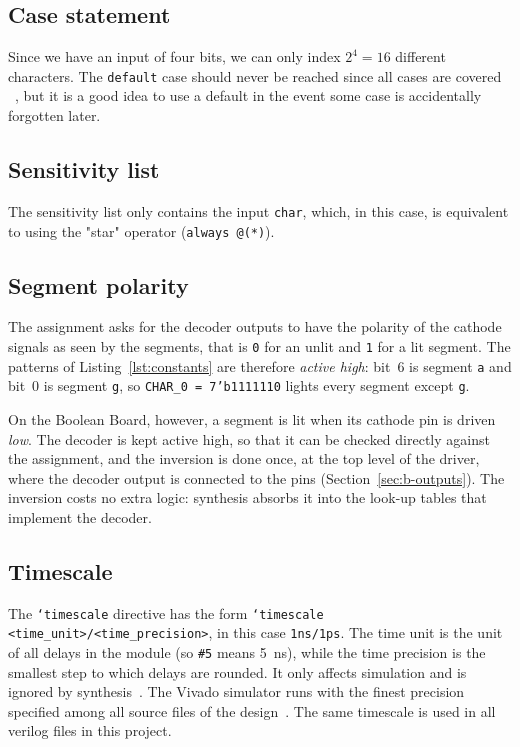 \documentclass{article}
\begin{document}


\subsection{Case statement}
Since we have an input of four bits, we can only index $2^4 = 16$ different characters.
The \texttt{default} case should never be reached since all cases are covered
~\cite[Case Statements]{ug901}, but it is a good idea to use a default in the event
some case is accidentally forgotten later.

\subsection{Sensitivity list}
The sensitivity list only contains the input \texttt{char}, which, in this case, is equivalent
to using the "star" operator (\texttt{always @(*)}).

\subsection{Segment polarity}
The assignment asks for the decoder outputs to have the polarity of the cathode
signals as seen by the segments, that is \texttt{0} for an unlit and \texttt{1}
for a lit segment. The patterns of Listing~\ref{lst:constants} are therefore
\emph{active high}: bit~6 is segment \texttt{a} and bit~0 is segment \texttt{g},
so \texttt{CHAR\_0 = 7'b1111110} lights every segment except \texttt{g}.

On the Boolean Board, however, a segment is lit when its cathode pin is driven
\emph{low}. The decoder is kept active high, so that it can be checked directly
against the assignment, and the inversion is done once, at the top level of the
driver, where the decoder output is connected to the pins (Section~\ref{sec:b-outputs}).
The inversion costs no extra logic: synthesis absorbs it into the look-up tables
that implement the decoder.

\subsection{Timescale}
The \texttt{`timescale} directive has the form
\texttt{`timescale} \texttt{<time\_unit>}\texttt{/}\texttt{<time\_precision>}, in this case \texttt{1ns/1ps}.
The time unit is the unit of all delays in the module (so \texttt{\#5} means
\SI{5}{\nano\second}), while the time precision is the smallest step to which
delays are rounded. It only affects simulation and is ignored by
synthesis~\cite[Table~23: Verilog Constructs]{ug901}.
The Vivado simulator runs with the finest precision specified among all source
files of the design~\cite{ug900}. The same timescale is used in all verilog files
in this project.
\end{document}
